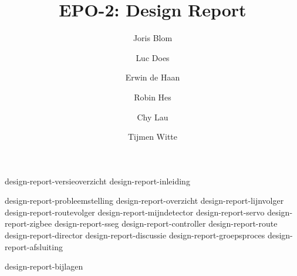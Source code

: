 \documentclass{report}
\title{EPO-2: Design Report\;\color{red}\superscript{ALPHA}}
\author{Joris {Blom} \and Luc {Does} \and Erwin {de Haan} \and Robin {Hes} \and Chy {Lau} \and Tijmen {Witte}}
\begin{document}
\maketitle
\newpage
{}

{design-report-versieoverzicht}
{design-report-inleiding}
\tableofcontents

\newpage
{}

{design-report-probleemstelling}
{design-report-overzicht}
{design-report-lijnvolger}
{design-report-routevolger}
{design-report-mijndetector}
{design-report-servo}
{design-report-zigbee}
{design-report-sseg}
{design-report-controller}
{design-report-route}
{design-report-director}
{design-report-discussie}
{design-report-groepsproces}
{design-report-afsluiting}

\newpage
{}

\printbibliography
{design-report-bijlagen}
\end{document}
